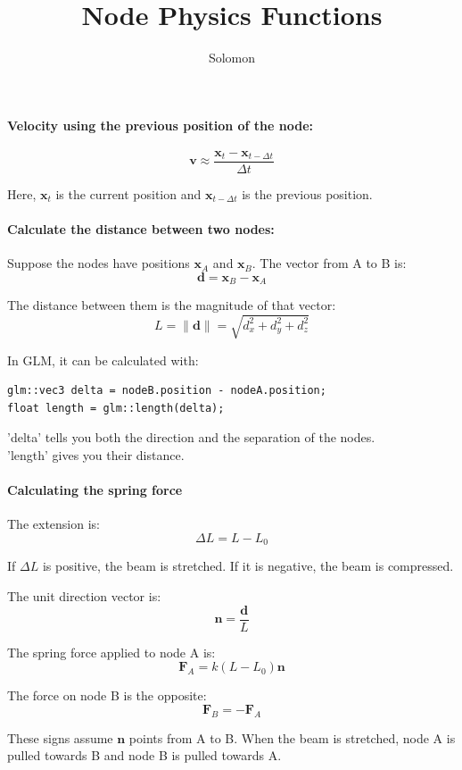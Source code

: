 \documentclass[11pt, a4paper]{article}
\title{Node Physics Functions}
\author{Solomon}
\begin{document}
\paragraph{Velocity using the previous position of the node:}

\begin{equation*}
\mathbf{v} \approx \frac{\mathbf{x}_t - \mathbf{x}_{t - \Delta t}}{\Delta t}
\end{equation*}

Here, $\mathbf{x}_t$ is the current position and $\mathbf{x}_{t - \Delta t}$ is the previous position.

\paragraph{Calculate the distance between two nodes:}

Suppose the nodes have positions \(\mathbf{x}_A\) and \(\mathbf{x}_B\).
The vector from A to B is:
\[
\mathbf{d}=\mathbf{x}_B-\mathbf{x}_A
\]

The distance between them is the magnitude of that vector:
\[
L=\|\mathbf{d}\|
=\sqrt{d_x^2+d_y^2+d_z^2}
\]

In GLM, it can be calculated with:

\begin{lstlisting}
glm::vec3 delta = nodeB.position - nodeA.position;
float length = glm::length(delta);
\end{lstlisting}

'delta' tells you both the direction and the separation of the nodes. \\
'length' gives you their distance.

\paragraph{Calculating the spring force}

The extension is:
\[
\Delta L=L-L_0
\]

If \(\Delta L\) is positive, the beam is stretched. If it is negative, the beam is compressed.

The unit direction vector is:
\[
\mathbf{n}=\frac{\mathbf{d}}{L}
\]

The spring force applied to node A is:
\[
\mathbf{F}_A=k(L-L_0)\mathbf{n}
\]

The force on node B is the opposite:
\[
\mathbf{F}_B=-\mathbf{F}_A
\]

These signs assume \(\mathbf{n}\) points from A to B. When the beam is stretched, node A is pulled towards B and node B is pulled towards A.
\end{document}
